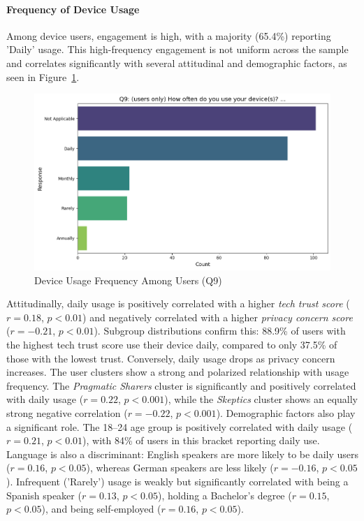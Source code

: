 	\paragraph{Frequency of Device Usage}
	Among device users, engagement is high, with a majority (65.4\%) reporting 'Daily' usage. This high-frequency engagement is not uniform across the sample and correlates significantly with several attitudinal and demographic factors, as seen in Figure~\ref{fig:Q9_usage_frequency}.
	\begin{figure}[ht]\centering
		\includegraphics[width=1\linewidth]{figures/questions/Q9_single_choice.png}
		\caption{Device Usage Frequency Among Users (Q9)}
		\label{fig:Q9_usage_frequency}
	\end{figure}
	Attitudinally, daily usage is positively correlated with a higher \textit{tech trust score} ($r = 0.18$, $p < 0.01$) and negatively correlated with a higher \textit{privacy concern score} ($r = -0.21$, $p < 0.01$). Subgroup distributions confirm this: 88.9\% of users with the highest tech trust score use their device daily, compared to only 37.5\% of those with the lowest trust. Conversely, daily usage drops as privacy concern increases.
	The user clusters show a strong and polarized relationship with usage frequency. The \textit{Pragmatic Sharers} cluster is significantly and positively correlated with daily usage ($r = 0.22$, $p < 0.001$), while the \textit{Skeptics} cluster shows an equally strong negative correlation ($r = -0.22$, $p < 0.001$).
	Demographic factors also play a significant role. The 18--24 age group is positively correlated with daily usage ($r = 0.21$, $p < 0.01$), with 84\% of users in this bracket reporting daily use. Language is also a discriminant: English speakers are more likely to be daily users ($r = 0.16$, $p < 0.05$), whereas German speakers are less likely ($r = -0.16$, $p < 0.05$). Infrequent ('Rarely') usage is weakly but significantly correlated with being a Spanish speaker ($r = 0.13$, $p < 0.05$), holding a Bachelor's degree ($r = 0.15$, $p < 0.05$), and being self-employed ($r = 0.16$, $p < 0.05$).

